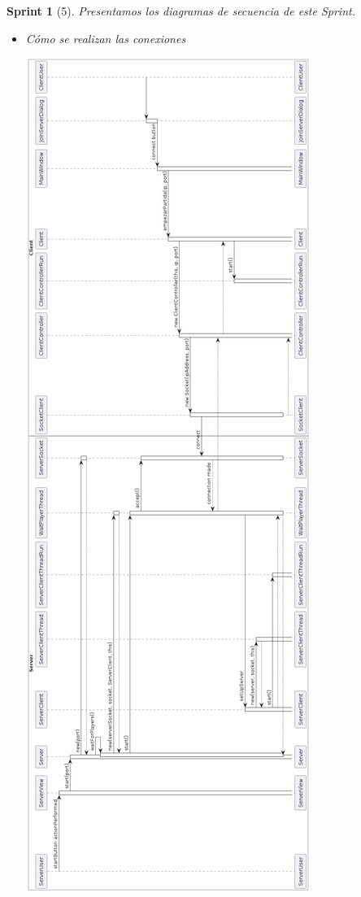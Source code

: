 \documentclass[12pt,a4paper,openright]{book}
\theoremstyle{break}
\newtheorem*{sprint}{Sprint}
\begin{document}
\begin{sprint}[5]
Presentamos los diagramas de secuencia de este Sprint.

\begin{itemize}

\item Cómo se realizan las conexiones

\begin{center}
\includegraphics[scale=0.45]{umlconexiones.png} 
\end{center}


\end{itemize}
\end{sprint}
\end{document}
